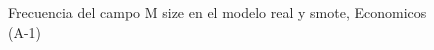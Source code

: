 \begin{figure}[H]
    \centering
    
    \caption{Frecuencia del campo M size en el modelo real y smote, Economicos (A-1)}
    \label{frecuency-M Size-smote-enc}
\end{figure}